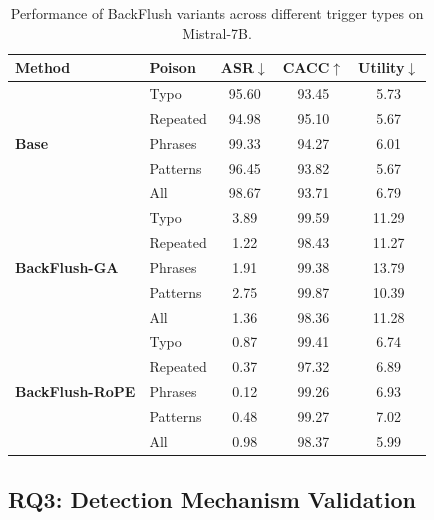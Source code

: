 \begin{table}[htbp]
\centering
\caption{Performance of BackFlush variants across different trigger types on Mistral-7B.}
\label{tab:poison_config}
\small
\renewcommand{\arraystretch}{1.2}
\begin{tabular}{l|l|ccc}
\toprule
\textbf{Method} & \textbf{Poison} & \textbf{ASR}$\downarrow$ & \textbf{CACC}$\uparrow$ & \textbf{Utility}$\downarrow$ \\
\midrule
\multirow{5}{*}{\textbf{Base}} 
& Typo & 95.60 & 93.45 & 5.73 \\
& \cellcolor{gray!15}Repeated & \cellcolor{gray!15}94.98 & \cellcolor{gray!15}95.10 & \cellcolor{gray!15}5.67 \\
& Phrases & 99.33 & 94.27 & 6.01 \\
& \cellcolor{gray!15}Patterns & \cellcolor{gray!15}96.45 & \cellcolor{gray!15}93.82 & \cellcolor{gray!15}5.67 \\
& All & 98.67 & 93.71 & 6.79 \\
\midrule
\multirow{5}{*}{\textbf{BackFlush-GA}} 
& Typo & 3.89 & 99.59 & 11.29 \\
& \cellcolor{gray!15}Repeated & \cellcolor{gray!15}1.22 & \cellcolor{gray!15}98.43 & \cellcolor{gray!15}11.27 \\
& Phrases & 1.91 & 99.38 & 13.79 \\
& \cellcolor{gray!15}Patterns & \cellcolor{gray!15}2.75 & \cellcolor{gray!15}99.87 & \cellcolor{gray!15}10.39 \\
& All & 1.36 & 98.36 & 11.28 \\
\midrule
\multirow{5}{*}{\textbf{BackFlush-RoPE}} 
& Typo & 0.87 & 99.41 & 6.74 \\
& \cellcolor{gray!15}Repeated & \cellcolor{gray!15}0.37 & \cellcolor{gray!15}97.32 & \cellcolor{gray!15}6.89 \\
& Phrases & 0.12 & 99.26 & 6.93 \\
& \cellcolor{gray!15}Patterns & \cellcolor{gray!15}0.48 & \cellcolor{gray!15}99.27 & \cellcolor{gray!15}7.02 \\
& All & 0.98 & 98.37 & 5.99 \\
\bottomrule
\end{tabular}
\end{table}


\subsection{RQ3: Detection Mechanism Validation}\label{subsec:bf_rq3}

